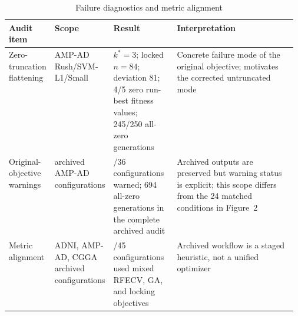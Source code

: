 \begin{table}[tbp]
\centering
\caption{Failure diagnostics and metric alignment}
\label{tab:main3}
\footnotesize
\renewcommand{\arraystretch}{1.10}
\setlength{\tabcolsep}{3pt}
\begin{tabularx}{\linewidth}{@{}>{\raggedright\arraybackslash}p{0.15\linewidth}>{\raggedright\arraybackslash}p{0.20\linewidth}>{\raggedright\arraybackslash}p{0.22\linewidth}>{\raggedright\arraybackslash}X@{}}
\toprule
\bfseries Audit item & \bfseries Scope & \bfseries Result & \bfseries Interpretation \\
\midrule
Zero-truncation flattening & AMP-AD Rush/SVM-L1/Small & $k^*=3$; locked $n=84$; deviation 81; 4/5 zero run-best fitness values; 245/250 all-zero generations & Concrete failure mode of the original objective; motivates the corrected untruncated mode \\
Original-objective warnings & 36 archived AMP-AD configurations & 18/36 configurations warned; 694 all-zero generations in the complete archived audit & Archived outputs are preserved but warning status is explicit; this scope differs from the 24 matched conditions in Figure~2 \\
Metric alignment & ADNI, AMP-AD, CGGA archived configurations & 45/45 configurations used mixed RFECV, GA, and locking objectives & Archived workflow is a staged heuristic, not a unified optimizer \\
\bottomrule
\end{tabularx}
\end{table}

